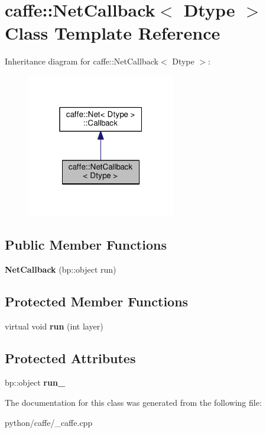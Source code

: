 \hypertarget{classcaffe_1_1_net_callback}{}\section{caffe\+:\+:Net\+Callback$<$ Dtype $>$ Class Template Reference}
\label{classcaffe_1_1_net_callback}


Inheritance diagram for caffe\+:\+:Net\+Callback$<$ Dtype $>$\+:
\nopagebreak
\begin{figure}[H]
\begin{center}
\leavevmode
\includegraphics[width=184pt]{classcaffe_1_1_net_callback__inherit__graph}
\end{center}
\end{figure}
\subsection*{Public Member Functions}
\begin{DoxyCompactItemize}
\item 
\mbox{\label{classcaffe_1_1_net_callback_a4835c11687a9e2863692e4818eb2209c}} 
{\bfseries Net\+Callback} (bp\+::object run)
\end{DoxyCompactItemize}
\subsection*{Protected Member Functions}
\begin{DoxyCompactItemize}
\item 
\mbox{\label{classcaffe_1_1_net_callback_a50c92c04681734044c62abd6cda4dfcb}} 
virtual void {\bfseries run} (int layer)
\end{DoxyCompactItemize}
\subsection*{Protected Attributes}
\begin{DoxyCompactItemize}
\item 
\mbox{\label{classcaffe_1_1_net_callback_a85443db34eda2aaa4dc2a2b10bc51f46}} 
bp\+::object {\bfseries run\+\_\+}
\end{DoxyCompactItemize}


The documentation for this class was generated from the following file\+:\begin{DoxyCompactItemize}
\item 
python/caffe/\+\_\+caffe.\+cpp\end{DoxyCompactItemize}
